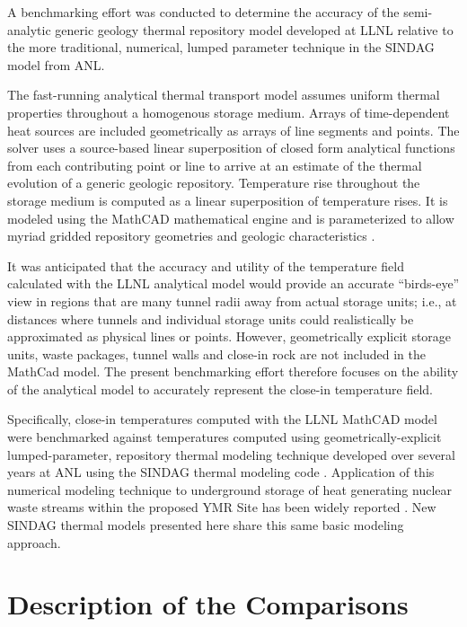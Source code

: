 
A benchmarking effort was conducted to determine the accuracy of the 
semi-analytic generic geology thermal repository model developed at 
\gls{LLNL}\cite{hardin_generic_2011,greenberg_investigations_2011,greenberg_application_2012} 
relative to the more traditional, numerical, lumped parameter technique in the 
\gls{SINDAG} model from \gls{ANL}.

The fast-running analytical thermal transport model assumes uniform thermal 
properties throughout a homogenous storage medium. Arrays of time-dependent heat 
sources are included geometrically as arrays of line segments and points.  The 
solver uses a source-based linear superposition of closed form analytical 
functions from each contributing point or line to arrive at an estimate of the 
thermal evolution of a generic geologic repository.  Temperature rise throughout 
the storage medium is computed as a linear superposition of temperature rises.  
It is modeled using the MathCAD mathematical engine and is parameterized to 
allow myriad gridded repository geometries and geologic characteristics 
\cite{ptc_mathcad_2010}.

It was anticipated that the accuracy and utility of the temperature field
calculated with the \gls{LLNL} analytical model would provide an accurate 
``birds-eye''
view in regions that are many tunnel radii away from actual storage units;
i.e., at distances where tunnels and individual storage units could
realistically be approximated as physical lines or points. 
However, geometrically explicit storage units, waste packages, tunnel
walls and close-in rock are not included in the MathCad model. 
The present benchmarking effort therefore focuses on the ability of the 
analytical model to accurately represent the close-in
temperature field.

Specifically, close-in temperatures computed with the \gls{LLNL} MathCAD model 
were benchmarked against temperatures computed using geometrically-explicit 
lumped-parameter, repository thermal modeling technique developed over several 
years at \gls{ANL} using the \gls{SINDAG} thermal modeling code 
\cite{gaski_sinda_1987}. Application of this numerical modeling technique to 
underground storage of heat generating nuclear waste streams within the proposed 
\gls{YMR} Site has been widely reported \cite{wigeland_separations_2006}.  New 
\gls{SINDAG} thermal models presented here share this same basic modeling 
approach. 

\section{Description of the Comparisons}


